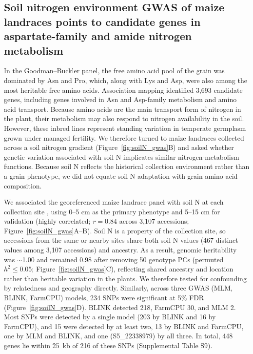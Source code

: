 \documentclass[namedate,unnumsec,webpdf,contemporary,large]{oup-authoring-template}
\begin{document}
\subsection{Soil nitrogen environment GWAS of maize landraces points to candidate genes in aspartate-family and amide nitrogen metabolism}

In the Goodman--Buckler panel, the free amino acid pool of the grain was dominated by Asn and Pro, which, along with Lys and Asp, were also among the most heritable free amino acids. Association mapping identified 3,693 candidate genes, including genes involved in Asn and Asp-family metabolism and amino acid transport. Because amino acids are the main transport form of nitrogen in the plant, their metabolism may also respond to nitrogen availability in the soil. However, these inbred lines represent standing variation in temperate germplasm grown under managed fertility. We therefore turned to maize landraces collected across a soil nitrogen gradient (Figure~\ref{fig:soilN_gwas}B) and asked whether genetic variation associated with soil N implicates similar nitrogen-metabolism functions. Because soil N reflects the historical collection environment rather than a grain phenotype, we did not equate soil N adaptation with grain amino acid composition.

We associated the georeferenced maize landrace panel \citep{RomeroNavarro2017Landraces} with soil N at each collection site \citep{Poggio2021SoilGrids}, using 0--5 cm as the primary phenotype and 5--15 cm for validation (highly correlated; $r = 0.84$ across 3,107 accessions; Figure~\ref{fig:soilN_gwas}A--B). Soil N is a property of the collection site, so accessions from the same or nearby sites share both soil N values (467 distinct values among 3,107 accessions) and ancestry. As a result, genomic heritability was $\sim$1.00 and remained 0.98 after removing 50 genotype PCs (permuted $h^2 \le 0.05$; Figure~\ref{fig:soilN_gwas}C), reflecting shared ancestry and location rather than heritable variation in the plants. We therefore tested for confounding by relatedness and geography directly. Similarly, across three GWAS (MLM, BLINK, FarmCPU) models, 234 SNPs were significant at 5\% FDR (Figure~\ref{fig:soilN_gwas}D). BLINK detected 218, FarmCPU 30, and MLM 2. Most SNPs were detected by a single model (203 by BLINK and 16 by FarmCPU), and 15 were detected by at least two, 13 by BLINK and FarmCPU, one by MLM and BLINK, and one (S5\_22338979) by all three. In total, 448 genes lie within 25~kb of 216 of these SNPs (Supplemental Table S9).
\end{document}
